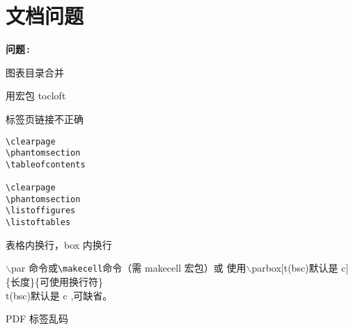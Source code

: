 
\section{文档问题}
\begin{list}
{\bfseries\sffamily 问题\,:\hfill}
{\setlength{\parsep}{\parskip}
 \setlength{\itemsep}{0ex plus0.1ex}
 \setlength{\labelwidth}{4em}
 \setlength{\labelsep}{0.2em}
 \setlength{\leftmargin}{6.2em}
 \setlength{\rightmargin}{2em}
  \setcounter{buzhou_latex}{0}
 \upshape
}


\item
\color{red}
图表目录合并\\
\normalcolor

用宏包 tocloft






\item
\color{red}
标签页链接不正确\\
\normalcolor

\begin{lstlisting}[language={[LaTeX]TeX}]
\clearpage
\phantomsection
\tableofcontents

\clearpage
\phantomsection
\listoffigures
\listoftables
\end{lstlisting}


\item
\color{red}
表格内换行，box 内换行\\
\normalcolor

$\backslash$par 命令或\verb|\makecell|命令（需 makecell 宏包）或
\textcolor[rgb]{0.00,0.00,0.63}{使用$\backslash$parbox[t(bsc)默认是 c]\{长度\}\{可使用换行符\}}\\
t(bsc)默认是 c ,可缺省。




\item
\color{red}
PDF 标签乱码\\
\normalcolor


\end{list}
